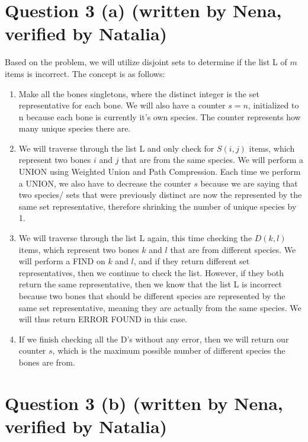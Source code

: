 \documentclass{article}
\begin{document}
\section*{Question 3 (a)  (written by Nena, verified by Natalia)}
Based on the problem, we will utilize disjoint sets to determine if the list L of \(m\) items is incorrect. The concept is as follows:
 \begin{enumerate}
    \item Make all the bones singletons, where the distinct integer is the set representative for each bone. We will also have a counter $s = n$, initialized to n because each bone is currently it's own species. The counter represents how many unique species there are.
    \item We will traverse through the list L and only check for $S(i, j)$ items, which represent two bones $i$ and $j$ that are from the same species. We will perform a UNION using Weighted Union and Path Compression. Each time we perform a UNION, we also have to decrease the counter $s$ because we are saying that two species/ sets that were previously distinct are now the represented by the same set representative, therefore shrinking the number of unique species by 1. 
    \item We will traverse through the list L again, this time checking the $D(k, l)$ items, which represent two bones $k$ and $l$ that are from different species. We will perform a FIND on $k$ and $l$, and if they return different set representatives, then we continue to check the list. However, if they both return the same representative, then we know that the list L is incorrect because two bones that should be different species are represented by the same set representative, meaning they are actually from the same species. We will thus return ERROR FOUND in this case. 
    \item If we finish checking all the D's without any error, then we will return our counter $s$, which is the maximum possible number of different species the bones are from.
    \end{enumerate}

\section*{Question 3 (b)  (written by Nena, verified by Natalia)}
\end{document}
